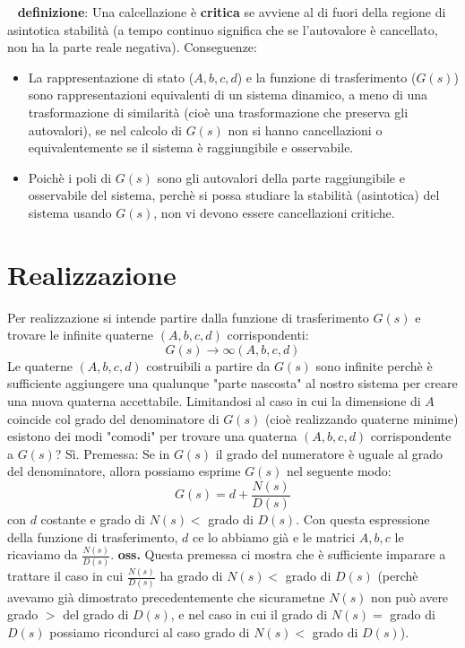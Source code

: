 \ \newline
\textbf{definizione}:  Una calcellazione è \textbf{critica} se avviene al di fuori della regione di asintotica stabilità (a tempo continuo significa che se l'autovalore è cancellato, non ha la parte reale negativa).
\newline
\newline
Conseguenze:
\begin{itemize}
    \item La rappresentazione di stato ($A,b,c,d$) e la funzione di trasferimento ($G(s)$) sono rappresentazioni equivalenti di un sistema dinamico, a meno di una trasformazione di similarità (cioè una trasformazione che preserva gli autovalori), se nel calcolo di $G(s)$ non si hanno cancellazioni o equivalentemente se il sistema è raggiungibile e osservabile.
    \item Poichè i poli di $G(s)$ sono gli autovalori della parte raggiungibile e osservabile del sistema, perchè si possa studiare la stabilità (asintotica) del sistema usando $G(s)$, non vi devono essere cancellazioni critiche.
\end{itemize}
\newpage
\section{Realizzazione}
Per realizzazione si intende partire dalla funzione di trasferimento $G(s)$ e trovare le infinite quaterne $(A,b,c,d)$ corrispondenti: 
\[
    G(s) \rightarrow \infty(A,b,c,d)
\]
Le quaterne $(A,b,c,d)$ costruibili a partire da $G(s)$ sono infinite perchè è sufficiente aggiungere una qualunque "parte nascosta" al nostro sistema per creare una nuova quaterna accettabile.\newline
\newline
Limitandosi al caso in cui la dimensione di $A$ coincide col grado del denominatore di $G(s)$ (cioè realizzando quaterne minime) esistono dei modi "comodi" per trovare una quaterna $(A,b,c,d)$ corrispondente a $G(s)$? Sì.\newline
\newline
Premessa: Se in $G(s)$ il grado del numeratore è uguale al grado del denominatore, allora possiamo esprime $G(s)$ nel seguente modo:
\[
    G(s) = d + \frac{N(s)}{D(s)}
\]
con $d$ costante e grado di $N(s) <$ grado di $D(s)$.\newline
Con questa espressione della funzione di trasferimento, $d$ ce lo abbiamo già e le matrici $A,b,c$ le ricaviamo da $\frac{N(s)}{D(s)}$.\newline
\newline
\textbf{oss.} Questa premessa ci mostra che è sufficiente imparare a trattare il caso in cui $\frac{N(s)}{D(s)}$ ha grado di $N(s) <$ grado di $D(s)$ (perchè avevamo già dimostrato precedentemente che sicurametne $N(s)$ non può avere grado $>$ del grado di $D(s)$, e nel caso in cui il grado di $N(s) = $ grado di $D(s)$ possiamo ricondurci al caso grado di $N(s) <$ grado di $D(s)$).

